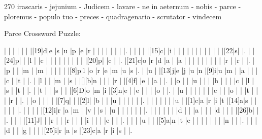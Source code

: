 \documentclass[12pt]{article}
\begin{document}
\pagestyle{fancy}
\fancyhf{}
\renewcommand{\headrulewidth}{0pt}
\renewcommand{\footrulewidth}{0pt}
\libertine
\renewcommand\PuzzleClueFont{\rm\normalsize}
\noindent\begin{rotate}{0}
\small
\end{rotate}
\hfill
\begin{rotate}{270}
\small
irascaris - jejunium - Judicem - lavare - ne in aeternum - nobis - parce - ploremus - populo tuo - preces - quadragenario - scrutator - vindecem
\end{rotate}
\begin{center}
  \huge{Parce Crossword Puzzle:}
\end{center}
\vspace{1.5cm}
\begin{Puzzle}{22}{24}
  |{}  |{}  |{}  |{}  |{}  |{}  |[19]d|e   |s   |u   |p   |e   |r   |{}  |{}  |{}  |{}  |{}  |{}  |{}  |.
  |{}  |{}  |{}  |{}  |[15]c|{}  |i   |{}  |{}  |{}  |{}  |{}  |{}  |{}  |{}  |{}  |{}  |{}  |[22]s|{}  |.
  |{}  |[24]p|{}  |{}  |l   |{}  |c   |{}  |{}  |{}  |{}  |{}  |{}  |{}  |{}  |{}  |[20]p|{}  |c   |{}  |.
  |[21]c|o   |r   |d   |a   |{}  |a   |{}  |{}  |{}  |{}  |{}  |{}  |{}  |{}  |{}  |r   |{}  |r   |{}  |.
  |{}  |p   |{}  |{}  |m   |{}  |m   |{}  |{}  |{}  |{}  |{}  |[8]p|l   |o   |r   |e   |m   |u   |s   |.
  |{}  |u   |{}  |[13]j|e   |j   |u   |n   |[9]i|u   |m   |{}  |a   |{}  |{}  |{}  |c   |{}  |t   |{}  |.
  |{}  |l   |{}  |{}  |m   |{}  |s   |{}  |[][b]n   |{}  |{}  |{}  |r   |{}  |[4]f|{}  |e   |{}  |a   |{}  |.
  |{}  |o   |{}  |{}  |u   |{}  |{}  |{}  |h   |{}  |{}  |{}  |c   |{}  |l   |{}  |s   |{}  |t   |{}  |.
  |{}  |t   |{}  |{}  |s   |{}  |{}  |[6]D|o   |m   |i   |[3]n|e   |{}  |e   |{}  |{}  |{}  |o   |{}  |.
  |{}  |u   |{}  |{}  |{}  |{}  |{}  |{}  |c   |{}  |{}  |o   |{}  |{}  |t   |{}  |{}  |{}  |r   |{}  |.
  |{}  |o   |{}  |{}  |{}  |{}  |[7]q|{}  |{}  |[2]l|{}  |b   |{}  |{}  |u   |{}  |{}  |{}  |{}  |{}  |.
  |{}  |{}  |{}  |{}  |{}  |{}  |u   |{}  |[1]c|a   |r   |i   |t   |[14]a|s   |{}  |{}  |{}  |{}  |{}  |.
  |{}  |{}  |{}  |{}  |[12]i|r   |a   |m   |{}  |v   |{}  |s   |{}  |u   |{}  |{}  |{}  |{}  |{}  |{}  |.
  |{}  |{}  |{}  |{}  |{}  |{}  |d   |{}  |{}  |a   |{}  |{}  |{}  |d   |{}  |{}  |{}  |[26]b|{}  |{}  |.
  |{}  |{}  |{}  |[11]J|{}  |{}  |r   |{}  |{}  |r   |{}  |{}  |{}  |i   |{}  |{}  |{}  |e   |{}  |{}  |.
  |{}  |{}  |{}  |u   |{}  |{}  |[5]a|n   |t   |e   |{}  |{}  |{}  |{}  |{}  |{}  |{}  |n   |{}  |{}  |.
  |{}  |{}  |{}  |d   |{}  |{}  |g   |{}  |{}  |{}  |[25]i|r   |a   |s   |[23]c|a   |r   |i   |s   |{}  |.

\end{Puzzle}
\end{document}

